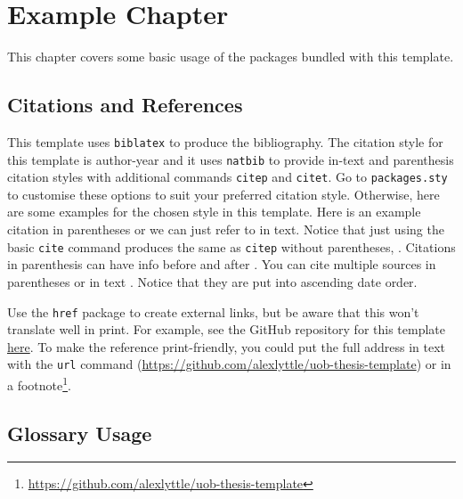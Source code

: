 %
%
%
%
%
\chapter{Example Chapter}

This chapter covers some basic usage of the packages bundled with this template.

\section{Citations and References}

This template uses \texttt{biblatex} to produce the bibliography. The citation style for this template is author-year and it uses \texttt{natbib} to provide in-text and parenthesis citation styles with additional commands \texttt{citep} and \texttt{citet}. Go to \texttt{packages.sty} to customise these options to suit your preferred citation style. Otherwise, here are some examples for the chosen style in this template. Here is an example citation in parentheses \citep{einstein} or we can just refer to \citet{dirac} in text. Notice that just using the basic \texttt{cite} command produces the same as \texttt{citep} without parentheses, \cite{knuth-fa}. Citations in parenthesis can have info before and after \citep[e.g.][chap. 2]{dirac}. You can cite multiple sources in parentheses \citep{einstein,knuth-fa,dirac} or in text \citet{einstein,dirac,knuth-fa}. Notice that they are put into ascending date order.

Use the \texttt{href} package to create external links, but be aware that this won't translate well in print. For example, see the GitHub repository for this template \href{https://github.com/alexlyttle/uob-thesis-template}{here}. To make the reference print-friendly, you could put the full address in text with the \texttt{url} command (\url{https://github.com/alexlyttle/uob-thesis-template}) or in a footnote\footnote{\url{https://github.com/alexlyttle/uob-thesis-template}}.

\section{Glossary Usage}

